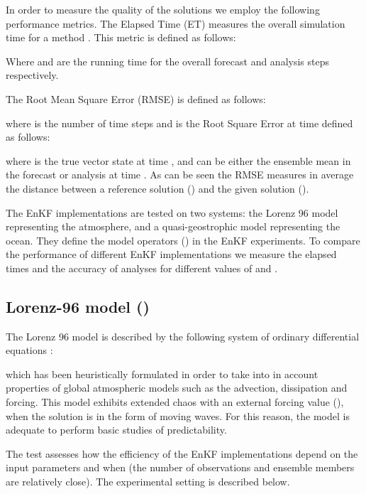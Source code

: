\documentclass[12pt]{article}
\begin{document}
In order to measure the quality of the solutions we employ the following performance metrics. The Elapsed Time (ET) measures the overall simulation time
for a method . This metric is defined as follows:

Where  and  are the running time for the overall forecast and analysis steps respectively. 

The Root Mean Square Error (RMSE) is defined as follows:

where  is the number of time steps and  is the Root Square Error at time  defined as follows:

where  is the true vector state at time , and  can be either the ensemble mean in the forecast  or analysis  at time . As can be seen the  RMSE measures in average the distance between a reference solution () and the given solution ().

The EnKF implementations are tested on two systems: the Lorenz 96 model \cite{Lorenz98} representing the atmosphere, and a quasi-geostrophic model \cite{Carton94} representing the ocean. They define the model operators () in the EnKF experiments. To compare the performance of different EnKF implementations we measure the elapsed times and the accuracy of analyses for different values of  and . 

\subsection{Lorenz-96 model ()}
\label{Results:Lorenz-Model}


The Lorenz 96 model is described by the following system of ordinary differential equations \cite{Lorenz98}:


which has been heuristically formulated in order to take into in account properties of global atmospheric models such as the advection,  dissipation and forcing. This model exhibits extended chaos with an external forcing value (), when the solution is in the form of moving waves. For this reason, the model is adequate to perform basic studies of predictability.

The test assesses how the efficiency of the EnKF implementations depend on the input parameters  and  when  (the number of observations and ensemble members are relatively close). The experimental setting is described below.
\end{document}
